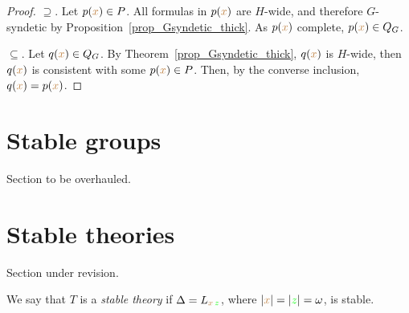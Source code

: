 \begin{proof}
  $\supseteq$. 
  Let $p({\color{brown} x})\in P$.
  All formulas in $p({\color{brown} x})$ are $H$-wide, and therefore $G$-syndetic by Proposition~\ref{prop_Gsyndetic_thick}.
  As $p({\color{brown} x})$ complete, $p({\color{brown} x})\in Q_G$.

  $\subseteq$.
  Let $q({\color{brown} x})\in Q_G$.
  By Theorem~\ref{prop_Gsyndetic_thick}, $q({\color{brown} x})$ is $H$-wide, then $q({\color{brown} x})$ is consistent with some $p({\color{brown} x})\in P$.
  Then, by the converse inclusion, $q({\color{brown} x})=p({\color{brown} x})$.
\end{proof}


\section{Stable groups}\label{stable_groups}


\noindent\llap{\textcolor{red}{\Large\warning}\kern1.5ex}\ignorespaces
Section to be overhauled.

\section{Stable theories}
\label{stable_theories}
\noindent\llap{\textcolor{red}{\Large\warning}\kern1.5ex}\ignorespaces
Section under revision.

 We say that $T$ is a \emph{stable theory\/} if $\Delta=L_{{\color{brown} x}\,{\color{green} z}}$, where $|{\color{brown} x}|=|{\color{green} z}|=\omega$, is stable.

